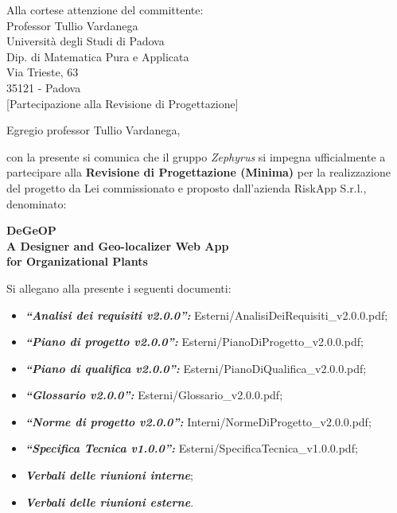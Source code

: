 \documentclass[a4paper,12pt]{letteracdp}
\author{Giulia Petenazzi}
\date{5 marzo 2017}
\begin{document}
	\begin{letter}{
			Alla cortese attenzione del committente: \\
			Professor Tullio Vardanega \\
			Università degli Studi di Padova \\
			Dip. di Matematica Pura e Applicata\\
			Via Trieste, 63 \\
			35121 - Padova\\}
		[Partecipazione alla Revisione di Progettazione]

	\opening{Egregio professor Tullio Vardanega,}
	con la presente si comunica che il gruppo \textit{Zephyrus} si impegna ufficialmente a partecipare alla \textbf{Revisione di Progettazione (Minima)} per la realizzazione del progetto da Lei commissionato e proposto dall'azienda RiskApp S.r.l., denominato:

	\begin{center}
        \textbf{DeGeOP \\ A Designer and Geo-localizer Web App \\for Organizational Plants}\\
	\end{center}
	\vspace{0.6cm}

	\noindent Si allegano alla presente
	 i seguenti documenti:


	\begin{itemize}
        \item \textit{\textbf{“Analisi dei requisiti v2.0.0”:}} Esterni/AnalisiDeiRequisiti\_v2.0.0.pdf;
		\item \textit{\textbf{“Piano di progetto v2.0.0”:}} Esterni/PianoDiProgetto\_v2.0.0.pdf;
		\item \textit{\textbf{“Piano di qualifica v2.0.0”:}} Esterni/PianoDiQualifica\_v2.0.0.pdf;
		\item \textit{\textbf{“Glossario v2.0.0”:}} Esterni/Glossario\_v2.0.0.pdf;
		\item \textit{\textbf{“Norme di progetto v2.0.0”:}} Interni/NormeDiProgetto\_v2.0.0.pdf;
		\item \textit{\textbf{“Specifica Tecnica v1.0.0”:}} Esterni/SpecificaTecnica\_v1.0.0.pdf;
		\item \textit{\textbf{Verbali delle riunioni interne}};
		\item \textit{\textbf{Verbali delle riunioni esterne}}.
	\end{itemize}


\end{letter}
\end{document}
